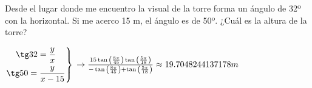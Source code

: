 \documentclass[addpoints,spanish, 12pt,a4paper]{exam}
\begin{document}
\begin{questions}
\question[2]   Desde el lugar donde me encuentro la visual de la torre forma un ángulo de 32º con la
horizontal. Si me acerco 15 m, el ángulo es de 50º. ¿Cuál es la altura de la torre?
\begin{solution} $\left. \begin{gathered}
	  \tg 32 = \frac{y}{x} \\
	  \tg 50 = \frac{y}{x-15} \hfill
	 \end{gathered}  \right\rbrace \\
	 \to 
	 \frac{15 \tan{\left (\frac{8 \pi}{45} \right )} \tan{\left (\frac{5 \pi}{18} \right )}}{- \tan{\left (\frac{8 \pi}{45} \right )} + \tan{\left (\frac{5 \pi}{18} \right )}}\approx19.7048244137178 m $ \end{solution}


\end{questions}
\end{document}
